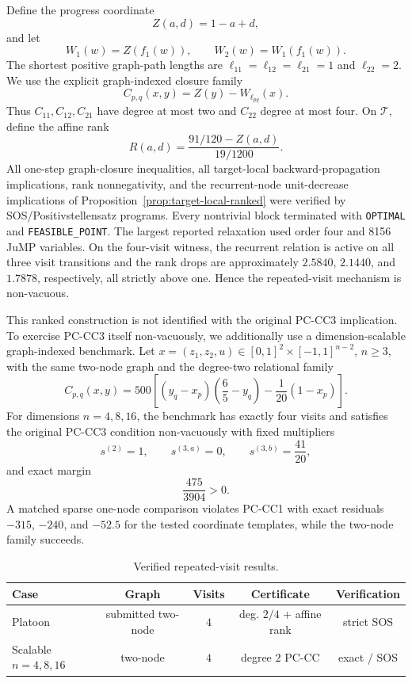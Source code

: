Define the progress coordinate
\[
Z(a,d)=1-a+d,
\]
and let
\[
W_1(w)=Z(f_1(w)),\qquad W_2(w)=W_1(f_1(w)).
\]
The shortest positive graph-path lengths are $\ell_{11}=\ell_{12}=\ell_{21}=1$ and $\ell_{22}=2$. We use the explicit graph-indexed closure family
\[
C_{p,q}(x,y)=Z(y)-W_{\ell_{pq}}(x).
\]
Thus $C_{11},C_{12},C_{21}$ have degree at most two and $C_{22}$ degree at most four. On $\mathcal T$, define the affine rank
\[
R(a,d)=\frac{91/120-Z(a,d)}{19/1200}.
\]
All one-step graph-closure inequalities, all target-local backward-propagation implications, rank nonnegativity, and the recurrent-node unit-decrease implications of Proposition~\ref{prop:target-local-ranked} were verified by SOS/Positivstellensatz programs. Every nontrivial block terminated with \texttt{OPTIMAL} and \texttt{FEASIBLE\_POINT}. The largest reported relaxation used order four and 8156 JuMP variables. On the four-visit witness, the recurrent relation is active on all three visit transitions and the rank drops are approximately $2.5840$, $2.1440$, and $1.7878$, respectively, all strictly above one. Hence the repeated-visit mechanism is non-vacuous.

This ranked construction is not identified with the original PC-CC3 implication. To exercise PC-CC3 itself non-vacuously, we additionally use a dimension-scalable graph-indexed benchmark. Let $x=(z_1,z_2,u)\in[0,1]^2\times[-1,1]^{n-2}$, $n\ge3$, with the same two-node graph and the degree-two relational family
\[
C_{p,q}(x,y)=500\left[(y_q-x_p)\left(\frac65-y_q\right)-\frac1{20}(1-x_p)\right].
\]
For dimensions $n=4,8,16$, the benchmark has exactly four visits and satisfies the original PC-CC3 condition non-vacuously with fixed multipliers
\[
s^{(2)}=1,\qquad s^{(3,a)}=0,\qquad s^{(3,b)}=\frac{41}{20},
\]
and exact margin
\[
\frac{475}{3904}>0.
\]
A matched sparse one-node comparison violates PC-CC1 with exact residuals $-315$, $-240$, and $-52.5$ for the tested coordinate templates, while the two-node family succeeds.

\begin{table}[t]
\centering
\caption{Verified repeated-visit results.}
\label{tab:revised-results}
\begin{tabular}{@{}lcccc@{}}
\toprule
Case & Graph & Visits & Certificate & Verification\\
\midrule
Platoon & submitted two-node & $4$ & deg. $2/4$ + affine rank & strict SOS\\
Scalable $n=4,8,16$ & two-node & $4$ & degree $2$ PC-CC & exact / SOS\\
\bottomrule
\end{tabular}
\end{table}
